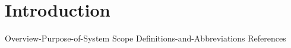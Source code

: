\newpage
\section{Introduction} %

{Overview-Purpose-of-System}
{Scope}
{Definitions-and-Abbreviations}
{References}
